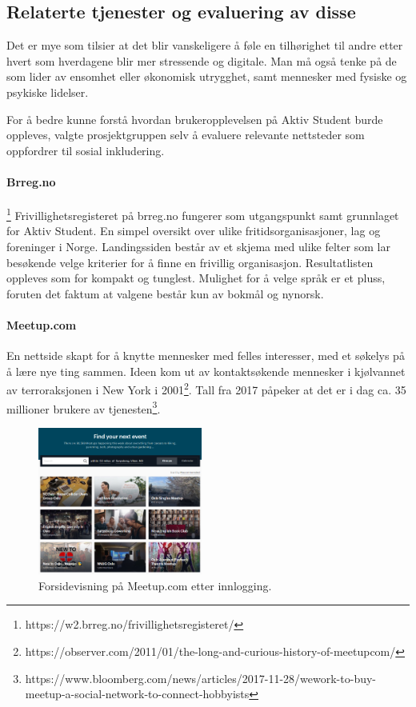 \subsection{Relaterte tjenester og evaluering av disse}
\label{section:relaterte-tjenester}

Det er mye som tilsier at det blir vanskeligere å føle en tilhørighet til andre etter hvert som hverdagene blir mer stressende og digitale. Man må også tenke på de som lider av ensomhet eller økonomisk utrygghet, samt mennesker med fysiske og psykiske lidelser.

For å bedre kunne forstå hvordan brukeropplevelsen på Aktiv Student burde oppleves, valgte prosjektgruppen selv å evaluere relevante nettsteder som oppfordrer til sosial inkludering. 

\paragraph{Brreg.no}\footnote{https://w2.brreg.no/frivillighetsregisteret/}
Frivillighetsregisteret på brreg.no fungerer som utgangspunkt samt grunnlaget for Aktiv Student. En simpel oversikt over ulike fritidsorganisasjoner, lag og foreninger i Norge. Landingssiden består av et skjema med ulike felter som lar besøkende velge kriterier for å finne en frivillig organisasjon. Resultatlisten oppleves som for kompakt og tunglest. Mulighet for å velge språk er et pluss, foruten det faktum at valgene består kun av bokmål og nynorsk.

\paragraph{Meetup.com} En nettside skapt for å knytte mennesker med felles interesser, med et søkelys på å lære nye ting sammen. Ideen kom ut av kontaktsøkende mennesker i kjølvannet av terroraksjonen i New York i 2001\footnote{https://observer.com/2011/01/the-long-and-curious-history-of-meetupcom/}. Tall fra 2017 påpeker at det er i dag ca. 35 millioner brukere av tjenesten\footnote{https://www.bloomberg.com/news/articles/2017-11-28/wework-to-buy-meetup-a-social-network-to-connect-hobbyists}.
\begin{figure}
  \begin{center}
    \includegraphics[width=0.48\textwidth]{Illustrasjoner/andre_platformer/meetup_forside.png}
  \end{center}
  \caption{Forsidevisning på Meetup.com etter innlogging.}
\end{figure}

